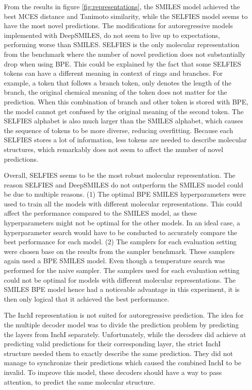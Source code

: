 From the results in figure \ref{fig:representations}, the SMILES model achieved the best MCES distance and Tanimoto similarity, while the SELFIES model seems to have the most novel predictions.
The modifications for autoregressive models implemented with DeepSMILES, do not seem to live up to expectations, performing worse than SMILES.
SELFIES is the only molecular representation from the benchmark where the number of novel prediction does not substantially drop when using \ac{BPE}.
This could be explained by the fact that some SELFIES tokens can have a different meaning in context of rings and branches. 
For example, a token that follows a branch token, only denotes the length of the branch, the original chemical meaning of the token does not matter for the prediction.
When this combination of branch and other token is stored with \ac{BPE}, the model cannot get confused by the original meaning of the second token.
The SELFIES alphabet is also much larger than the SMILES alphabet, which causes the sequence of tokens to be more diverse, reducing overfitting.
Because each SELFIES stores a lot of information, less tokens are needed to describe molecular structures, which remarkably does not seem to affect the number of novel predictions.

Overall, SELFIES seems to be the most robust molecular representation.
The reason SELFIES and DeepSMILES do not outperform the SMILES model could be due to multiple reasons.
(1) The optimal \ac{BPE} SMILES hyperparameters were used to train all the models with different molecular representations.
This could affect the performance compared to the SMILES model, as these hyperparameters might not be optimal for the other models.
In an ideal case, a hyperparameter search would have to be conducted to accurately compare the best performance for each model.
(2) The samplers for each evaluation setting were chosen base on the results from the sampler benchmark.
These samplers again used a \ac{BPE} SMILES model. Even though a temperature search was performed for the naive sampler.
The samplers used for each evaluation setting could not be optimal for models with different molecular representations.
The SMILES \ac{BPE} model hence had a noticeable advantage in this experiment, it is then only logical that it achieved the best performance.

The InchI representation is not suited for autoregressive prediction.
The idea for the multiple decoder model was to divide the prediction problem by predicting the layers from InchI separately.
Unfortunately, while the decoders did achieve at predicting valid predictions for their corresponding layer, the strict InchI structure needed them to exactly describe the same prediction.
They did not manage to synchronize their predictions which caused the combined InchI to be invalid.
To improve this model, these decoders should have a way to pass attention, to predict the same molecular structure.

